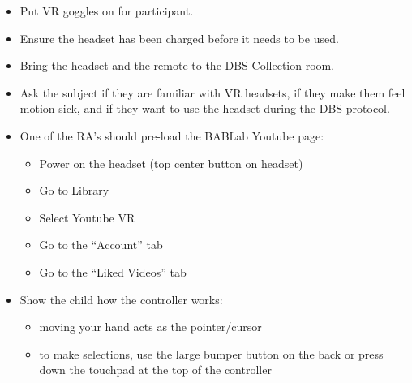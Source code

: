 \documentclass[]{book}
\providecommand{\tightlist}{%
  \setlength{\itemsep}{0pt}\setlength{\parskip}{0pt}}
\begin{document}
\begin{itemize}
\tightlist
\item
  Put VR goggles on for participant.
\item
  Ensure the headset has been charged before it needs to be used.
\item
  Bring the headset and the remote to the DBS Collection room.
\item
  Ask the subject if they are familiar with VR headsets, if they make them feel motion sick, and if they want to use the headset during the DBS protocol.
\item
  One of the RA's should pre-load the BABLab Youtube page:

  \begin{itemize}
  \tightlist
  \item
    Power on the headset (top center button on headset)
  \item
    Go to Library
  \item
    Select Youtube VR
  \item
    Go to the ``Account'' tab
  \item
    Go to the ``Liked Videos'' tab
  \end{itemize}
\item
  Show the child how the controller works:

  \begin{itemize}
  \item
    moving your hand acts as the pointer/cursor
  \item
    to make selections, use the large bumper button on the back or press down the touchpad at the top of the controller


\end{itemize}
\end{itemize}
\end{document}
